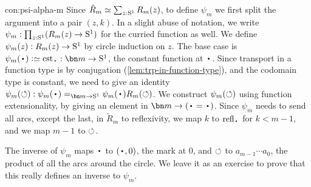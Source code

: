 \begin{implementation}{con:psi-alpha-m}
  Since $\tilde R_m \jdeq \sum_{z:\Sc}R_m(z)$,
  to define $\psi_m$ we first split the argument into a pair $(z,k)$.
  In a slight abuse of notation, we write $\psi_m : \prod_{z:{\mathrm{S}^1}}(R_m(z) \to {\mathrm{S}^1})$
  for the curried function as well.
  We define $\psi_m(z) : R_m(z) \to {\mathrm{S}^1}$ by circle induction on $z$.
  The base case is $\psi_m(\base) \defeq \cst\base : \bn m \to \Sc$,
  the constant function at $\base$.
  Since transport in a function type is by conjugation
  (\cref{lem:trp-in-function-type}),
  and the codomain type is constant,
  we need to give an identity
  $\psi_m(\Sloop) : \psi_m(\base) =_{\bn m\to\Sc} \psi_m(\base)R_m(\Sloop)$.
  We construct $\psi_m(\circlearrowleft)$ using function extensionality,
  by giving an element in $\bn m\to(\base=\base)$.
  Since $\psi_m$ needs to send all arcs, except the last,
  in $\tilde R_m$ to reflexivity,
  we map $k$ to $\refl\base$ for $k<m-1$,
  and we map $m-1$ to $\circlearrowleft$.

  The inverse of $\psi_m$ maps $\base$ to $(\base,0)$, \ie the mark at $0$,
  and $\circlearrowleft$ to $a_{m-1}\cdots a_0$,
  \ie the product of all the arcs around the circle.
  We leave it as an exercise to prove that this really defines an inverse to $\psi_m$.


\end{implementation}
